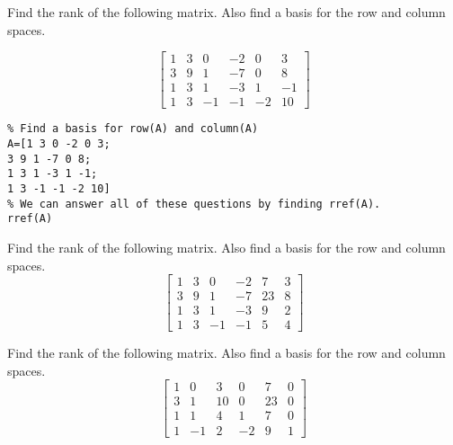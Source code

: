 \documentclass{ximera}
\begin{document}
\begin{problem}\label{prb:5.32} Find the rank of the following matrix. Also find a basis for the row
and column spaces.

\begin{equation*}
\left[
\begin{array}{rrrrrr}
1 & 3 & 0 & -2 & 0 & 3 \\
3 & 9 & 1 & -7 & 0 & 8 \\
1 & 3 & 1 & -3 & 1 & -1 \\
1 & 3 & -1 & -1 & -2 & 10
\end{array}
\right]
\end{equation*}

\begin{hint}
    \begin{verbatim}
% Find a basis for row(A) and column(A)
A=[1 3 0 -2 0 3; 
3 9 1 -7 0 8;
1 3 1 -3 1 -1;
1 3 -1 -1 -2 10]
% We can answer all of these questions by finding rref(A).
rref(A)
\end{verbatim}
\end{hint}
\end{problem}

\begin{problem}\label{prb:5.33} Find the rank of the following matrix. Also find a basis for the row
and column spaces.
\begin{equation*}
\left[
\begin{array}{rrrrrr}
1 & 3 & 0 & -2 & 7 & 3 \\
3 & 9 & 1 & -7 & 23 & 8 \\
1 & 3 & 1 & -3 & 9 & 2 \\
1 & 3 & -1 & -1 & 5 & 4
\end{array}
\right]
\end{equation*}
\end{problem}

\begin{problem}\label{prb:5.34} Find the rank of the following matrix. Also find a basis for the row
and column spaces.
\begin{equation*}
\left[
\begin{array}{rrrrrr}
1 & 0 & 3 & 0 & 7 & 0 \\
3 & 1 & 10 & 0 & 23 & 0 \\
1 & 1 & 4 & 1 & 7 & 0 \\
1 & -1 & 2 & -2 & 9 & 1
\end{array}
\right]
\end{equation*}

\end{problem}
\end{document}
